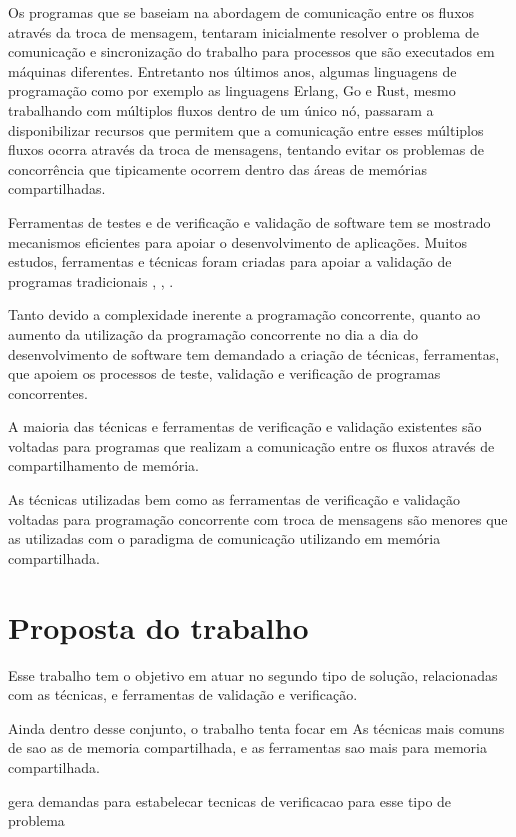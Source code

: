  Os programas que se baseiam na abordagem de comunicação entre os fluxos através da troca de mensagem, tentaram inicialmente resolver o problema de comunicação e sincronização do trabalho para processos que são executados em máquinas diferentes. Entretanto nos últimos anos, algumas linguagens de programação como por exemplo as linguagens Erlang, Go e Rust, mesmo trabalhando com múltiplos fluxos dentro de um único nó, passaram a disponibilizar recursos que permitem que a comunicação entre esses múltiplos fluxos ocorra através da troca de mensagens, tentando evitar os problemas de concorrência que tipicamente ocorrem dentro das áreas de memórias compartilhadas.

 Ferramentas de testes e de verificação e validação de software tem se mostrado mecanismos eficientes para apoiar o desenvolvimento de aplicações. Muitos estudos, ferramentas e técnicas foram criadas para apoiar a validação de programas tradicionais \cite{myers_art_2012}, \cite{DAVIDCOWARD1988189}, \cite{umar2019study}.

 Tanto devido a complexidade inerente a programação concorrente, quanto ao aumento da utilização da programação concorrente no dia a dia do desenvolvimento de software tem demandado a criação de técnicas, ferramentas, que apoiem os processos de teste, validação e verificação de programas concorrentes. 
 
 A maioria das técnicas e ferramentas de verificação e validação existentes são voltadas para programas que realizam a comunicação entre os fluxos através de compartilhamento de memória.

 As técnicas utilizadas bem como as ferramentas de verificação e validação voltadas para programação concorrente com troca de mensagens são menores que as utilizadas com o paradigma de comunicação utilizando em memória compartilhada.

 \section{Proposta do trabalho}

Esse trabalho tem o objetivo em atuar no segundo tipo de solução, relacionadas com as técnicas, e ferramentas de validação e verificação.  

Ainda dentro desse conjunto, o trabalho tenta focar em As técnicas mais comuns de sao as de memoria compartilhada, e as ferramentas sao mais para memoria compartilhada.

gera demandas para estabelecar tecnicas de verificacao para esse tipo de problema

